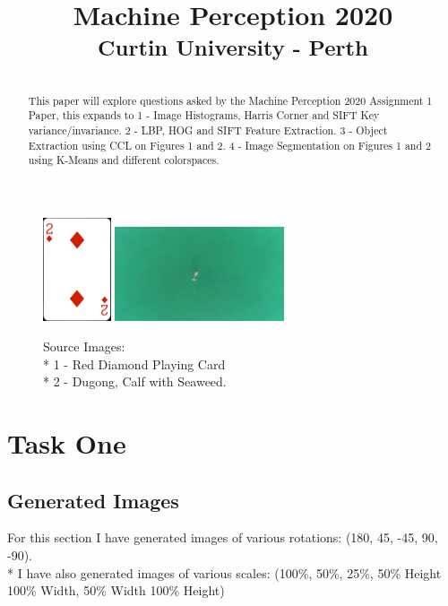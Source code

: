 \documentclass[conference]{IEEEtran}
\begin{document}
\title{Machine Perception 2020\\
{\footnotesize \textsuperscript{Curtin University - Perth}}
}

\author{
}

\maketitle
\begin{figure}[!htbp]
    \centerline{{\includegraphics[width=20mm, scale=0.5]{./figures/diamond2.png}}
    {\includegraphics[width=50mm, scale=0.5]{./figures/Dugong.jpg}}}
    \caption{Source Images:\\*
    1 - Red Diamond Playing Card \\*
    2 - Dugong, Calf with Seaweed.}
    \label{fig}
\end{figure}
\begin{abstract}
This paper will explore questions asked by the Machine Perception 2020 Assignment 1 Paper, this expands to
1 - Image Histograms, Harris Corner and SIFT Key variance/invariance.
2 - LBP, HOG and SIFT Feature Extraction.
3 - Object Extraction using CCL on Figures 1 and 2.
4 - Image Segmentation on Figures 1 and 2 using K-Means and different colorspaces.
\end{abstract}
\section{Task One}
\subsection{Generated Images}
For this section I have generated images of various rotations: (180\degree, 45\degree, -45\degree, 90\degree, -90\degree).\\*
I have also generated images of various scales: (100\%, 50\%, 25\%, 50\% Height 100\% Width, 50\% Width 100\% Height)
\end{document}
